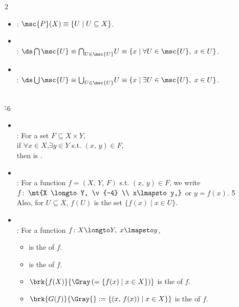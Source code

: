 \documentclass[dvipdfmx,a4paper,titlepage,9pt]{jsarticle}
\begin{document}
\begin{multicols*}{2}
\begin{itemize}
\begin{itemize}
   \setlength{\leftskip}{-10pt}
   \item[$\cdot$] : $\msc{P}(X)\equiv\{U\mid U\subseteq X\}$.
   \item[$\cdot$]  \\
   \;: $\ds\bigcap\msc{U}\equiv\bigcap_{U\in\msc{U}}\!U\equiv\{x\mid \forall U\in\msc{U},\;x\in U\}$.
   \item[$\cdot$]  \\
   \;: $\ds\bigcup\msc{U}\equiv\bigcup_{U\in\msc{U}}\!U\equiv\{x\mid \exists U\in\msc{U},\;x\in U\}$.
   \end{itemize}
\end{itemize}

\vfill\null\columnbreak

\\
\hspace{12pt}{\small\Gray($f$: function,\;$X,\,Y$: nonempty sets)} \v{-6}
\begin{itemize}[label=-]
\item{} \\
: For a set $F\subseteq X\times Y$, \\
\;\;if $\forall x\in X$,\;$\exists y\in Y$ s.t. $(x,\,y)\in F$, \\
\;\;then  is . \\

\item {} \\
: For a function $f=(X,\,Y,\,F)$ s.t. $(x,\,y)\in F$, we write\\
\;\;$f\!:\;\mt{X \longto Y, \v{-4} \\ x\lmapsto y,}$ or $y=f(x)$. \v5 \\
\;\;Also, for $U\subseteq X$, $f(U)$ is the set $\{f(x)\mid x\in U\}$. \\

\item{} \\
 : For a function $f\!: X\longto Y,\;x\lmapsto y$, 
\begin{itemize}[label={$\cdot$}]
\item{} is the  of $f$.
\item{} is the  of $f$.
\item$\brk{f(X)}{\Gray\,(=\{f(x)\mid x\in X\})}$ is the  of $f$.
\item$\brk{G(f)}{\Gray{}:=\{(x,\,f(x))\mid x\in X\}}$ is the  of $f$. \\
\end{itemize}


\end{itemize}
\end{multicols*}
\end{document}
